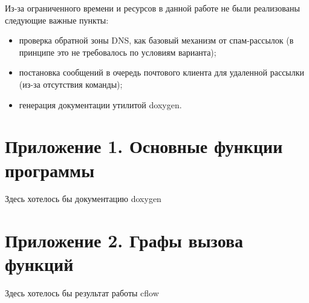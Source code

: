 \documentclass[a4paper,12pt]{report}
\begin{document}
Из-за ограниченного времени и ресурсов в данной работе не были реализованы следующие важные пункты:
\begin{itemize}
    \item проверка обратной зоны DNS, как базовый механизм от спам-рассылок (в принципе это не требовалось по условиям варианта);
    \item постановка сообщений в очередь почтового клиента для удаленной рассылки (из-за отсутствия команды);
    \item генерация документации утилитой doxygen.
\end{itemize}


\cleardoublepage
{}
{}
\chapter*{Приложение 1. Основные функции программы}

Здесь хотелось бы документацию doxygen


% 

% 
% 
% 
% 
% 
% 
% 
% 
% 
% 


\cleardoublepage
{}
{}
\chapter*{Приложение 2. Графы вызова функций}

Здесь хотелось бы результат работы cflow




\end{document}
